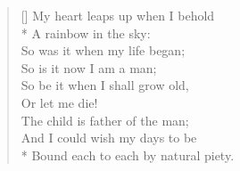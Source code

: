 \documentclass[MAIN]{subfiles}
\begin{document}
\settowidth{\versewidth}{Bound each to each by natural piety.}
\begin{verse}[\versewidth]
My heart leaps up when I behold\\*
\vin A rainbow in the sky:\\
So was it when my life began;\\
So is it now I am a man;\\
So be it when I shall grow old,\\
\vin Or let me die!\\
The child is father of the man;\\
And I could wish my days to be\\*
Bound each to each by natural piety.
\end{verse}
\end{document}
